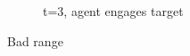 \begin{figure}
\begin{subfigure}[b]{0.3\textwidth}
                \caption{t=3, agent engages target}
                \label{fig:bad_range_t_3}
        \end{subfigure}
        \caption{Bad range}\label{fig:bad_range}
\end{figure}